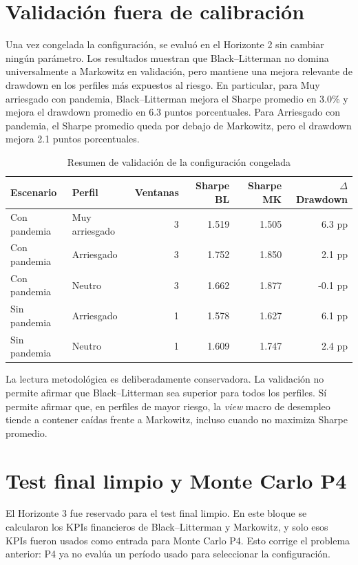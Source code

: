 \documentclass[11pt]{article}
\begin{document}
\section{Validaci\'on fuera de calibraci\'on}

Una vez congelada la configuraci\'on, se evalu\'o en el Horizonte 2 sin cambiar ning\'un par\'ametro. Los resultados muestran que Black--Litterman no domina universalmente a Markowitz en validaci\'on, pero mantiene una mejora relevante de drawdown en los perfiles m\'as expuestos al riesgo. En particular, para Muy arriesgado con pandemia, Black--Litterman mejora el Sharpe promedio en 3.0\% y mejora el drawdown promedio en 6.3 puntos porcentuales. Para Arriesgado con pandemia, el Sharpe promedio queda por debajo de Markowitz, pero el drawdown mejora 2.1 puntos porcentuales.

\begin{table}[H]
\centering
\caption{Resumen de validaci\'on de la configuraci\'on congelada}
\label{tab:validacion}
\begin{tabular}{l l r r r r}
\toprule
Escenario & Perfil & Ventanas & Sharpe BL & Sharpe MK & $\Delta$ Drawdown \\
\midrule
Con pandemia & Muy arriesgado & 3 & 1.519 & 1.505 & 6.3 pp \\
Con pandemia & Arriesgado & 3 & 1.752 & 1.850 & 2.1 pp \\
Con pandemia & Neutro & 3 & 1.662 & 1.877 & -0.1 pp \\
Sin pandemia & Arriesgado & 1 & 1.578 & 1.627 & 6.1 pp \\
Sin pandemia & Neutro & 1 & 1.609 & 1.747 & 2.4 pp \\
\bottomrule
\end{tabular}
\end{table}

La lectura metodol\'ogica es deliberadamente conservadora. La validaci\'on no permite afirmar que Black--Litterman sea superior para todos los perfiles. S\'i permite afirmar que, en perfiles de mayor riesgo, la \textit{view} macro de desempleo tiende a contener ca\'idas frente a Markowitz, incluso cuando no maximiza Sharpe promedio.

\section{Test final limpio y Monte Carlo P4}

El Horizonte 3 fue reservado para el test final limpio. En este bloque se calcularon los KPIs financieros de Black--Litterman y Markowitz, y solo esos KPIs fueron usados como entrada para Monte Carlo P4. Esto corrige el problema anterior: P4 ya no eval\'ua un per\'iodo usado para seleccionar la configuraci\'on.
\end{document}

